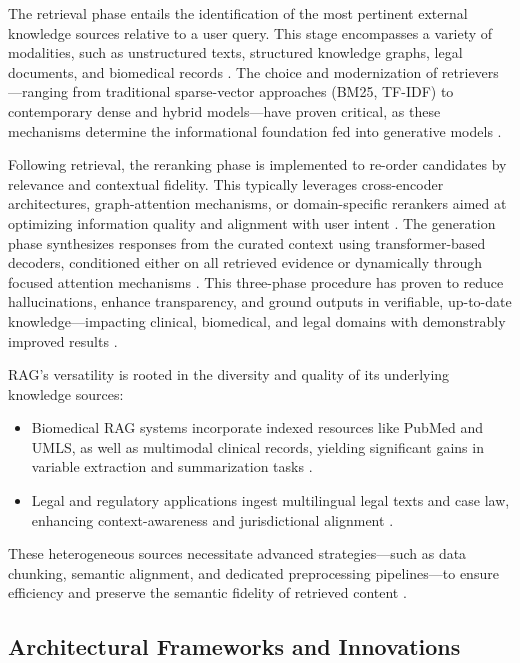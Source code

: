 \documentclass[sigconf]{acmart}
\begin{document}
The retrieval phase entails the identification of the most pertinent external knowledge sources relative to a user query. This stage encompasses a variety of modalities, such as unstructured texts, structured knowledge graphs, legal documents, and biomedical records \cite{ref42, ref49, ref51, ref52, ref54, ref55, ref63}. The choice and modernization of retrievers—ranging from traditional sparse-vector approaches (BM25, TF-IDF) to contemporary dense and hybrid models—have proven critical, as these mechanisms determine the informational foundation fed into generative models \cite{ref10, ref35, ref52, ref54}.

Following retrieval, the reranking phase is implemented to re-order candidates by relevance and contextual fidelity. This typically leverages cross-encoder architectures, graph-attention mechanisms, or domain-specific rerankers aimed at optimizing information quality and alignment with user intent \cite{ref4, ref36, ref37}. The generation phase synthesizes responses from the curated context using transformer-based decoders, conditioned either on all retrieved evidence or dynamically through focused attention mechanisms \cite{ref5, ref16, ref17, ref37}. This three-phase procedure has proven to reduce hallucinations, enhance transparency, and ground outputs in verifiable, up-to-date knowledge—impacting clinical, biomedical, and legal domains with demonstrably improved results \cite{ref64}.

RAG’s versatility is rooted in the diversity and quality of its underlying knowledge sources:

\begin{itemize}
    \item Biomedical RAG systems incorporate indexed resources like PubMed and UMLS, as well as multimodal clinical records, yielding significant gains in variable extraction and summarization tasks \cite{ref42, ref52, ref54, ref55, ref63}.
    \item Legal and regulatory applications ingest multilingual legal texts and case law, enhancing context-awareness and jurisdictional alignment \cite{ref49, ref51, ref63}.
\end{itemize}

These heterogeneous sources necessitate advanced strategies—such as data chunking, semantic alignment, and dedicated preprocessing pipelines—to ensure efficiency and preserve the semantic fidelity of retrieved content \cite{ref52, ref54}.

\subsection{Architectural Frameworks and Innovations}
\end{document}
